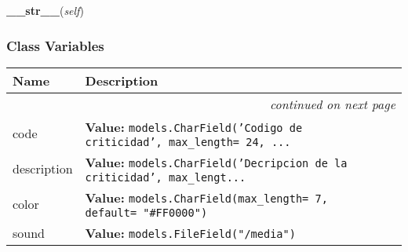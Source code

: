     \label{GroundSegment:models:Alarm:Criticity:Criticity:__str__}

    \vspace{0.5ex}

\hspace{.8\funcindent}\begin{boxedminipage}{\funcwidth}

    \raggedright \textbf{\_\_str\_\_}(\textit{self})

\setlength{\parskip}{2ex}
\setlength{\parskip}{1ex}
    \end{boxedminipage}



  \subsubsection{Class Variables}

    \vspace{-1cm}
\hspace{\varindent}\begin{longtable}{|p{\varnamewidth}|p{\vardescrwidth}|l}
\cline{1-2}
\cline{1-2} \centering \textbf{Name} & \centering \textbf{Description}& \\
\cline{1-2}
\endhead\cline{1-2}\multicolumn{3}{r}{\small\textit{continued on next page}}\\\endfoot\cline{1-2}
\endlastfoot\raggedright c\-o\-d\-e\- & \raggedright \textbf{Value:} 
{\tt models.CharField('Codigo de criticidad', max\_length= 24, \texttt{...}}&\\
\cline{1-2}
\raggedright d\-e\-s\-c\-r\-i\-p\-t\-i\-o\-n\- & \raggedright \textbf{Value:} 
{\tt models.CharField('Decripcion de la criticidad', max\_lengt\texttt{...}}&\\
\cline{1-2}
\raggedright c\-o\-l\-o\-r\- & \raggedright \textbf{Value:} 
{\tt models.CharField(max\_length= 7, default= "\#FF0000")}&\\
\cline{1-2}
\raggedright s\-o\-u\-n\-d\- & \raggedright \textbf{Value:} 
{\tt models.FileField("/media")}&\\
\cline{1-2}
\end{longtable}

